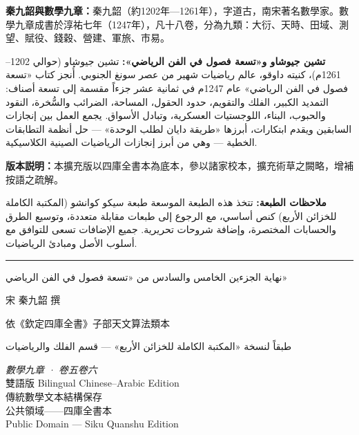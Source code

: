 \documentclass[11pt,a4paper]{article}
\newcommand{\ChinCol}[1]{\begin{minipage}[t]{0.48\textwidth}#1\end{minipage}}
\newcommand{\ArabCol}[1]{\begin{minipage}[t]{0.48\textwidth}\arabicfont\beginR #1\endR\end{minipage}}
\newcommand{\parallelsection}[2]{%
  \noindent\ChinCol{#1}\hfill\ArabCol{#2}\par\vspace{0.5cm}%
}
\begin{document}
\parallelsection{%
\textbf{秦九韶與數學九章：}秦九韶（約1202年—1261年），字道古，南宋著名數學家。數學九章成書於淳祐七年（1247年），凡十八卷，分為九類：大衍、天時、田域、測望、賦役、錢穀、營建、軍旅、市易。%
}{%
\textbf{تشين جيوشاو و«تسعة فصول في الفن الرياضي»:} تشين جيوشاو (حوالي 1202--1261م)، كنيته داوقو، عالم رياضيات شهير من عصر سونغ الجنوبي. أُنجز كتاب «تسعة فصول في الفن الرياضي» عام 1247م في ثمانية عشر جزءاً مقسمة إلى تسعة أصناف: التمديد الكبير، الفلك والتقويم، حدود الحقول، المساحة، الضرائب والسُّخرة، النقود والحبوب، البناء، اللوجستيات العسكرية، وتبادل الأسواق. يجمع العمل بين إنجازات السابقين ويقدم ابتكارات، أبرزها «طريقة دايان لطلب الوحدة» --- حل أنظمة التطابقات الخطية --- وهي من أبرز إنجازات الرياضيات الصينية الكلاسيكية.%
}

\parallelsection{%
\textbf{版本説明：}本擴充版以四庫全書本為底本，參以諸家校本，擴充術草之闕略，增補按語之疏解。%
}{%
\textbf{ملاحظات الطبعة:} تتخذ هذه الطبعة الموسعة طبعة سيكو كوانشو (المكتبة الكاملة للخزائن الأربع) كنص أساسي، مع الرجوع إلى طبعات مقابلة متعددة، وتوسيع الطرق والحسابات المختصرة، وإضافة شروحات تحريرية. جميع الإضافات تسعى للتوافق مع أسلوب الأصل ومبادئ الرياضيات.%
}

\vspace{1.5cm}
\begin{center}
{\color{rulecolor}\rule{0.5\textwidth}{0.4pt}}

\vspace{1em}

{\arabicfont\beginR\large نهاية الجزءين الخامس والسادس من «تسعة فصول في الفن الرياضي»\endR}

\vspace{0.3cm}

{\small 宋 \quad 秦九韶 \quad 撰}

\vspace{0.2cm}

{\small\color{notecolor} 依《欽定四庫全書》子部天文算法類本}

\vspace{0.2cm}

{\small\arabicfont\beginR\color{notecolor}
طبقاً لنسخة «المكتبة الكاملة للخزائن الأربع» --- قسم الفلك والرياضيات
\endR}

\vspace{0.5cm}

{\small\color{sectioncolor}
\textit{數學九章 · 卷五卷六}\\[0.3em]
雙語版 \textbar{} Bilingual Chinese--Arabic Edition\\[0.3em]
傳統數學文本結構保存\\[0.3em]
公共領域——四庫全書本\\
Public Domain --- Siku Quanshu Edition}

\end{center}
\end{document}
